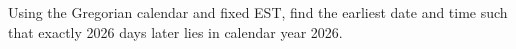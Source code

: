 Using the Gregorian calendar and fixed EST, find the earliest date and time such that exactly 2026 days later lies in calendar year 2026.
